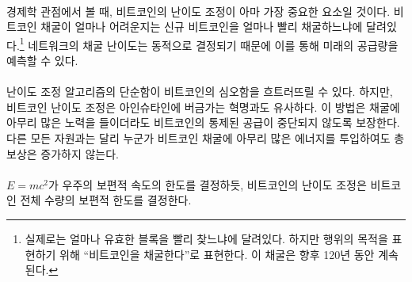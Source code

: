 \paragraph{}
\begin{comment}	
	Viewed through the lens of economics, Bitcoin's \textit{difficulty adjustment}
	is probably its most important component. How hard it is to mine bitcoin depends
	on how quickly new bitcoins are mined.\footnote{It actually depends on how
		quickly valid blocks are found, but for our purposes, this is the same thing as
		\enquote{mining bitcoins} and will be so for the next 120 years.} It is the dynamic
	adjustment of the network's mining difficulty which enables us to predict its
	future supply.
\end{comment}
경제학 관점에서 볼 때, 비트코인의 난이도 조정이 아마 가장 중요한 요소일 것이다.
비트코인 채굴이 얼마나 어려운지는 신규 비트코인을 얼마나 빨리 채굴하느냐에 달려있다.\footnote{실제로는 얼마나 유효한 블록을 빨리 찾느냐에 달려있다. 
	하지만 행위의 목적을 표현하기 위해 \enquote{비트코인을 채굴한다}로 표현한다. 
	이 채굴은 향후 120년 동안 계속된다.}
네트워크의 채굴 난이도는 동적으로 결정되기 때문에 이를 통해 미래의 공급량을 예측할 수 있다.

\paragraph{}
\begin{comment}	
	The simplicity of the difficulty adjustment algorithm might distract
	from its profundity, but the difficulty adjustment truly is a revolution
	of Einsteinian proportions. It ensures that, no matter how much or how
	little effort is spent on mining, Bitcoin's controlled supply won't be
	disrupted. As opposed to every other resource, no matter how much
	energy someone will put into mining bitcoin, the total reward will not
	increase.
\end{comment}
난이도 조정 알고리즘의 단순함이 비트코인의 심오함을 흐트러뜨릴 수 있다. 
하지만, 비트코인 난이도 조정은 아인슈타인에 버금가는 혁명과도 유사하다.
이 방법은 채굴에 아무리 많은 노력을 들이더라도 비트코인의 통제된 공급이 중단되지 않도록 보장한다.
다른 모든 자원과는 달리 누군가 비트코인 채굴에 아무리 많은 에너지를 투입하여도 총 보상은 증가하지 않는다.

\paragraph{}
\begin{comment}	
	Just like $E=mc^2$ dictates the universal speed limit in our universe,
	Bitcoin's difficulty adjustment dictates the \textbf{universal money limit}
	in Bitcoin.
\end{comment}
$E=mc^2$가 우주의 보편적 속도의 한도를 결정하듯, 
비트코인의 난이도 조정은 비트코인 전체 수량의 보편적 한도를 결정한다.

